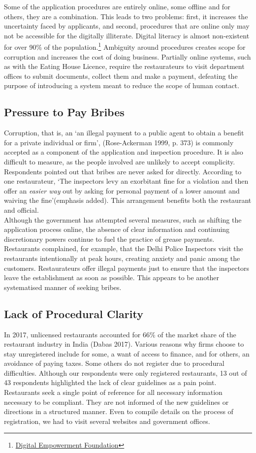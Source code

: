 \documentclass[a4paper, 12pt]{article}
\begin{document}
		Some of the application procedures are entirely online, some offline and for others, they are a combination. This leads to two problems: first, it increases the uncertainty faced by applicants, and second, procedures that are online only may not be 
accessible for the digitally illiterate. Digital literacy is almost non-existent for over 90\% of the population.\footnote{\href{https://bit.ly/2NMWdaj}{Digital Empowerment Foundation}}  Ambiguity around procedures creates scope for corruption and increases the cost of 
doing business. Partially online systems, such as with the Eating House Licence, require the restaurateurs to visit department offices to submit documents, collect them and make a payment, defeating the purpose of introducing a system meant to reduce the scope 
of human contact.
		
		\subsection{Pressure to Pay Bribes}
		Corruption, that is, an ‘an illegal payment to a public agent to obtain a benefit for a private individual or firm’, (Rose-Ackerman 1999, p. 373) is commonly accepted as a component of the application and inspection procedure. It is also difficult to measure, 
as the people involved are unlikely to accept complicity. Respondents pointed out that bribes are never asked for directly. According to one restaurateur, ‘The inspectors levy an exorbitant fine for a violation and then offer an \textit{easier way} out by asking for 
personal payment of a lower amount and waiving the fine’(emphasis added). This arrangement benefits both the restaurant and official.\\
		Although the government has attempted several measures, such as shifting the application process online, the absence of clear information and continuing discretionary powers continue to fuel the practice of grease payments. Restaurants complained, 
for example, that the Delhi Police Inspectors visit the restaurants intentionally at peak hours, creating anxiety and panic among the customers. Restaurateurs offer illegal payments just to ensure that the inspectors leave the establishment as soon as possible. This 
appears to be another systematised manner of seeking bribes.
				
		\subsection {Lack of Procedural Clarity}
		In 2017, unlicensed restaurants accounted for 66\% of the market share of the restaurant industry in India (Dabas 2017). Various reasons why firms choose to stay unregistered include for some, a want of access to finance, and for others, an avoidance 
of paying taxes. Some others do not register due to procedural difficulties. Although our respondents were only registered restaurants, 13 out of 43 respondents highlighted the lack of clear guidelines as a pain point. Restaurants seek a single point of reference for 
all necessary information necessary to be compliant. They are not informed of the new guidelines or directions in a structured manner. Even to compile details on the process of registration, we had to visit several websites and government offices.
		
\end{document}
